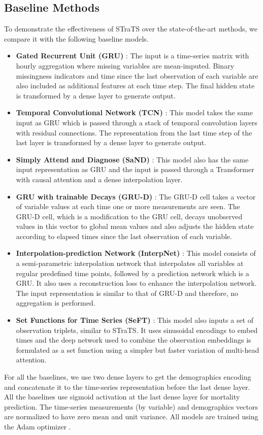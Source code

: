 \subsection{Baseline Methods} 
To demonstrate the effectiveness of STraTS over the state-of-the-art methods, 
we compare it with the following baseline models.
\begin{itemize}
\item \textbf{Gated Recurrent Unit (GRU)} \citep{chung2014empirical}: The input is a time-series matrix with hourly aggregation where missing variables are mean-imputed. Binary missingness indicators and time since the last observation of each variable are also included as additional features at each time step. The final hidden state is transformed by a dense layer to generate output.
\item \textbf{Temporal Convolutional Network (TCN)} \citep{bai2018empirical}: This model takes the same input as GRU which is passed through a stack of temporal convolution layers with residual connections. The representation from the last time step of the last layer is transformed by a dense layer to generate output.
    \item \textbf{Simply Attend and Diagnose (SaND)} \citep{song2018attend}: This model also has the same input representation as GRU and the input is passed through a Transformer with causal attention and a dense interpolation layer.
    \item \textbf{GRU with trainable Decays (GRU-D)} \citep{che2018recurrent}: The GRU-D cell takes a vector of variable values at each time one or more measurements are seen. The GRU-D cell, which is a modification to the GRU cell, decays unobserved values in this vector to global mean values and also adjusts the hidden state according to elapsed times since the last observation of each variable.
    \item \textbf{Interpolation-prediction Network (InterpNet)} \citep{shukla2019interpolation}: This model consists of a semi-parametric interpolation network that interpolates all variables at regular predefined time points,
    followed by a prediction network which is a GRU. It also uses a reconstruction loss to enhance the interpolation network. The input representation is similar to that of GRU-D and therefore, no aggregation is performed.
    \item \textbf{Set Functions for Time Series (SeFT)} \citep{horn2020set}: This model also inputs a set of observation triplets, similar to STraTS. It uses sinusoidal encodings to embed times and the deep network used to combine the observation embeddings is formulated as a set function using a simpler but faster variation of multi-head attention.
\end{itemize}
For all the baselines, we use two dense layers to get the demographics encoding and concatenate it to the time-series representation before the last dense layer. All the baselines use sigmoid activation at the last dense layer for mortality prediction. The time-series measurements (by variable) and demographics vectors are normalized to have zero mean and unit variance. All models are trained using the Adam optimizer \citep{kingma2014adam}.

